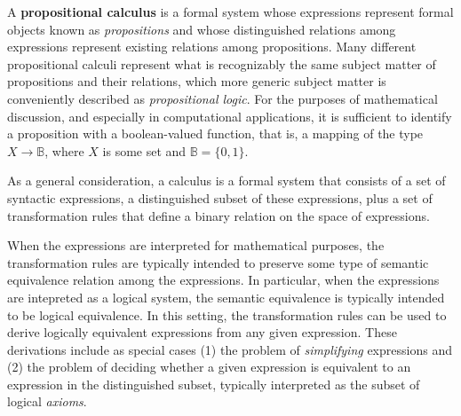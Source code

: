 \documentclass[12pt]{article}
\begin{document}

A \textbf{propositional calculus} is a formal system whose expressions represent formal objects known as \textit{propositions} and whose distinguished relations among expressions represent existing relations among propositions.  Many different propositional calculi represent what is recognizably the same subject matter of propositions and their relations, which more generic subject matter is conveniently described as \textit{propositional logic}.  For the purposes of mathematical discussion, and especially in computational applications, it is sufficient to identify a proposition with a boolean-valued function, that is, a mapping of the type $X \to \mathbb{B}$, where $X$ is some set and $\mathbb{B} = \{ 0, 1 \}$.

As a general consideration, a calculus is a formal system that consists of a set of syntactic expressions, a distinguished subset of these expressions, plus a set of transformation rules that define a binary relation on the space of expressions.  

When the expressions are interpreted for mathematical purposes, the transformation rules are typically intended to preserve some type of semantic equivalence relation among the expressions.  In particular, when the expressions are intepreted as a logical system, the semantic equivalence is typically intended to be logical equivalence.  In this setting, the transformation rules can be used to derive logically equivalent expressions from any given expression.  These derivations include as special cases (1) the problem of \textit{simplifying} expressions and (2) the problem of deciding whether a given expression is equivalent to an expression in the distinguished subset, typically interpreted as the subset of logical \textit{axioms}.
\end{document}
